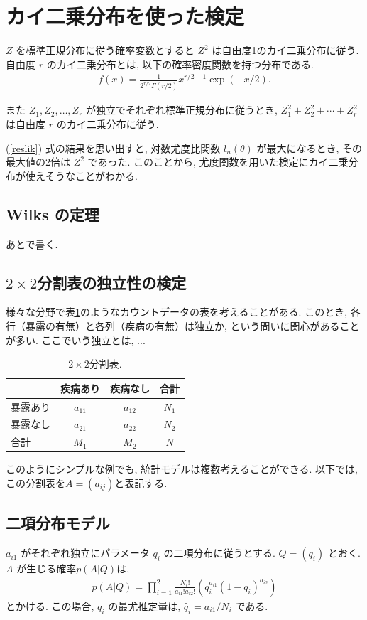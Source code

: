 \documentclass[a4paper, 12pt]{jarticle}
\begin{document}
\section{カイ二乗分布を使った検定}

$Z$ を標準正規分布に従う確率変数とすると $Z^2$ は自由度1のカイ二乗分布に従う. 
自由度 $r$ のカイ二乗分布とは, 以下の確率密度関数を持つ分布である. 
\begin{align}
f(x) = \frac{1}{2^{r/2}\Gamma(r/2)}x^{r/2-1}\exp(-x/2).
\end{align}

また $Z_1, Z_2, \ldots, Z_r$ が独立でそれぞれ標準正規分布に従うとき, $Z_1^2+ Z_2^2+ \cdots +Z_r^2$ は自由度 $r$ のカイ二乗分布に従う. 

(\ref{reslik}) 式の結果を思い出すと, 対数尤度比関数 $l_n(\theta)$ が最大になるとき, その最大値の2倍は $Z^2$ であった. このことから, 尤度関数を用いた検定にカイ二乗分布が使えそうなことがわかる. 

\subsection{Wilks の定理}
\label{secWilks}
あとで書く. 

\subsection{$2 \times 2$分割表の独立性の検定}
様々な分野で表\ref{2by2}のようなカウントデータの表を考えることがある. このとき, 各行（暴露の有無）と各列（疾病の有無）は独立か, という問いに関心があることが多い. 
ここでいう独立とは, ...

\begin{table}[htbp]
\centering
\caption{$2 \times 2$分割表.}
\label{2by2}
\begin{tabular}{l|cc|c}
 & 疾病あり&疾病なし&合計\\
 \hline
 暴露あり&$a_{11}$&$a_{12}$&$N_1$\\
 暴露なし&$a_{21}$&$a_{22}$&$N_2$\\
  \hline
 合計 & $M_1$ & $M_2$ & $N$
\end{tabular}
\end{table}

このようにシンプルな例でも, 統計モデルは複数考えることができる. 以下では, この分割表を$A=(a_{ij})$と表記する. 

\subsection{二項分布モデル}
$a_{i1}$ がそれぞれ独立にパラメータ $q_i$ の二項分布に従うとする.  
$Q=(q_i)$ とおく. 
$A$ が生じる確率$p(A|Q)$は, 
\begin{align}
p(A|Q) = \prod_{i=1}^2 \frac{N_i!}{a_{i1}!a_{i2}!}( q_i^{a_{i1}}(1-q_{i})^{a_{i2}})
\end{align}
とかける.
この場合, $q_i$ の最尤推定量は, $\hat q_{i}=a_{i1}/N_i$ である. 
\end{document}

